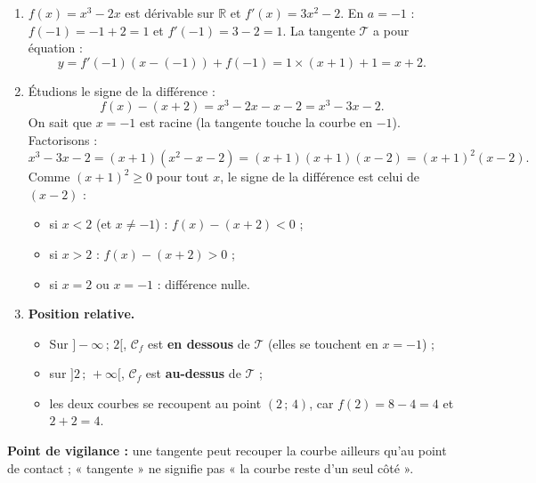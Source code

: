 \documentclass[11pt]{article}
\begin{document}
\begin{corrige}
\begin{enumerate}
    \item $f(x)=x^3-2x$ est dérivable sur $\mathbb{R}$ et $f'(x)=3x^2-2$. En $a=-1$ : $f(-1)=-1+2=1$ et $f'(-1)=3-2=1$. La tangente $\mathcal{T}$ a pour équation :
    \[
    y=f'(-1)(x-(-1))+f(-1)=1\times(x+1)+1=x+2.
    \]
    \item Étudions le signe de la différence :
    \[
    f(x)-(x+2)=x^3-2x-x-2=x^3-3x-2.
    \]
    On sait que $x=-1$ est racine (la tangente touche la courbe en $-1$). Factorisons :
    \[
    x^3-3x-2=(x+1)(x^2-x-2)=(x+1)(x+1)(x-2)=(x+1)^2(x-2).
    \]
    Comme $(x+1)^2\ge 0$ pour tout $x$, le signe de la différence est celui de $(x-2)$ :
    \begin{itemize}
        \item si $x<2$ (et $x\neq -1$) : $f(x)-(x+2)<0$ ;
        \item si $x>2$ : $f(x)-(x+2)>0$ ;
        \item si $x=2$ ou $x=-1$ : différence nulle.
    \end{itemize}
    \item \textbf{Position relative.}
    \begin{itemize}
        \item Sur $]-\infty\,;\,2[$, $\mathcal{C}_f$ est \textbf{en dessous} de $\mathcal{T}$ (elles se touchent en $x=-1$) ;
        \item sur $]2\,;\,+\infty[$, $\mathcal{C}_f$ est \textbf{au-dessus} de $\mathcal{T}$ ;
        \item les deux courbes se recoupent au point $(2\,;\,4)$, car $f(2)=8-4=4$ et $2+2=4$.
    \end{itemize}
\end{enumerate}

\textbf{Point de vigilance :} une tangente peut recouper la courbe ailleurs qu'au point de contact ; « tangente » ne signifie pas « la courbe reste d'un seul côté ».
\end{corrige}
\end{document}
